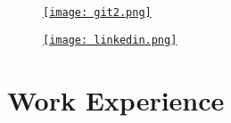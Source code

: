 \documentclass[11px]{article}
\begin{document}
    \begin{figure}[!htb]
        
            
        \begin{minipage}{0.05\textwidth}
        
        \href{https://www.github.com/BogdanVM} {\texttt{[image: git2.png]} }
        
        \end{minipage}\hfill
        \begin{minipage}{0.15\textwidth}
            \href{https://www.linkedin.com/in/bogdan-vilculescu/} {
                \texttt{[image: linkedin.png]} 
            }
        
        \end{minipage}
    
    \end{figure}
    
    \section{Work Experience }
\end{document}
